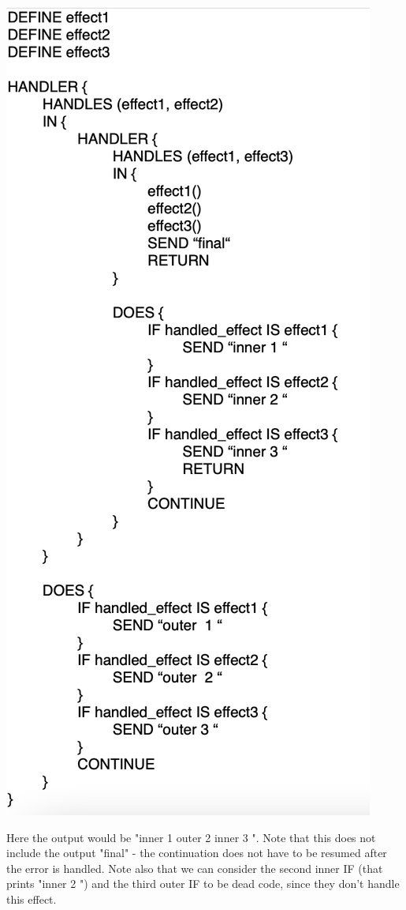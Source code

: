 \documentclass[logo,bsc,singlespacing,parskip,online]{infthesis}
\begin{document}
\includegraphics[scale=0.4]{pseudocode_handler.png}

Here the output would be "inner 1 outer 2 inner 3 ". Note that this does not include the output "final" - the continuation does not have to be resumed after the error is handled. Note also that we can consider the second inner IF (that prints "inner 2 ") and the third outer IF to be dead code, since they don't handle this effect.
\end{document}
